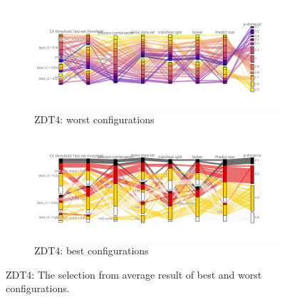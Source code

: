     \begin{figure}
        \centering
        \begin{subfigure}{\textwidth}
            \includegraphics[width=\textwidth]{content/images/conf_zdt4_worst}
            \caption{ZDT4: worst configurations}
            \label{fig:conf_zdt4_worst}
        \end{subfigure} 
        \hfill
        
        \begin{subfigure}{\textwidth}
            \includegraphics[width=\textwidth]{content/images/conf_zdt4_best}
            \caption{ZDT4: best configurations}
            \label{fig:zdt6_ndf}
        \end{subfigure} 

        \caption[ZDT4: The selection from average result of best and worst configurations.]{ZDT4: The selection from average result of best and worst configurations.}
        \label{fig:conf_zdt4_best}    
    \end{figure}

